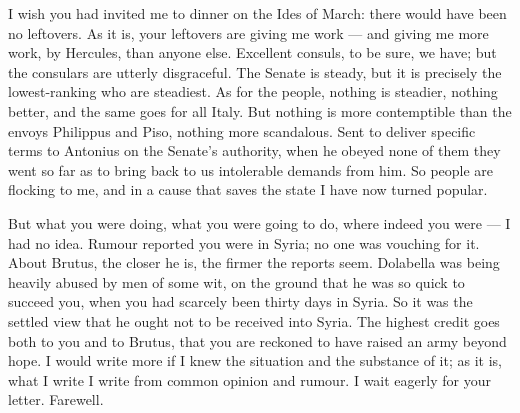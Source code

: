 

 I wish you had invited me to dinner on the Ides of March: there would have been no leftovers. As it is, your leftovers are giving me work --- and giving me more work, by Hercules, than anyone else. Excellent consuls, to be sure, we have; but the consulars are utterly disgraceful. The Senate is steady, but it is precisely the lowest-ranking who are steadiest. As for the people, nothing is steadier, nothing better, and the same goes for all Italy. But nothing is more contemptible than the envoys Philippus and Piso, nothing more scandalous. Sent to deliver specific terms to Antonius on the Senate's authority, when he obeyed none of them they went so far as to bring back to us intolerable demands from him. So people are flocking to me, and in a cause that saves the state I have now turned popular.

 But what you were doing, what you were going to do, where indeed you were --- I had no idea. Rumour reported you were in Syria; no one was vouching for it. About Brutus, the closer he is, the firmer the reports seem. Dolabella was being heavily abused by men of some wit, on the ground that he was so quick to succeed you, when you had scarcely been thirty days in Syria. So it was the settled view that he ought not to be received into Syria. The highest credit goes both to you and to Brutus, that you are reckoned to have raised an army beyond hope. I would write more if I knew the situation and the substance of it; as it is, what I write I write from common opinion and rumour. I wait eagerly for your letter. Farewell.
